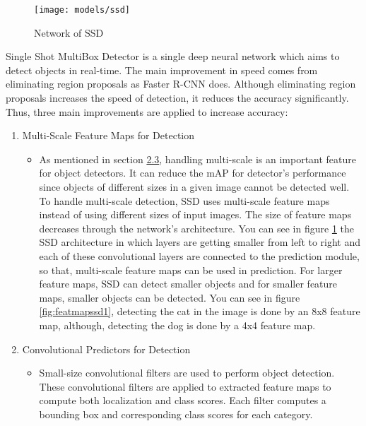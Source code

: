 \documentclass{article}
\begin{document}
\setlength{\parindent}{6ex}

\begin{figure}
    \centering
    \texttt{[image: models/ssd]}
    \caption{Network of SSD \cite{ssdcite}}
    \label{fig:ssd1}
\end{figure}

\indent

Single Shot MultiBox Detector \cite{ssdcite} is a single deep neural network which aims to detect 
objects in real-time. The main improvement in speed comes from eliminating region 
proposals as Faster R-CNN does. Although eliminating region proposals increases 
the speed of detection, it reduces the accuracy significantly. Thus, three main 
improvements are applied to increase accuracy:

\begin{enumerate}
    \item Multi-Scale Feature Maps for Detection
    \begin{itemize}
        \item As mentioned in section \hyperref[sec:multscale]{2.3}, handling multi-scale is an important feature 
for object detectors. It can reduce the mAP for detector's performance since objects 
of different sizes in a given image cannot be detected well. To handle multi-scale detection, 
SSD uses multi-scale feature maps instead of using different sizes of input images. 
The size of feature maps decreases through the network's architecture. You can see in figure 
\ref{fig:ssd1} the SSD architecture in which layers are getting smaller from left to right and 
each of these convolutional layers are connected to the prediction module, so that, multi-scale 
feature maps can be used in prediction. For larger feature maps, SSD can detect smaller objects 
and for smaller feature maps, smaller objects can be detected. You can see in figure 
\ref{fig:featmapssd1}, detecting the cat in the image is done by an 8x8 feature map, although, detecting 
the dog is done by a 4x4 feature map.
    \end{itemize}
    \item Convolutional Predictors for Detection
    \begin{itemize}
        \item Small-size convolutional filters are used to perform object detection. 
        These convolutional filters are applied to extracted feature maps to compute 
        both localization and class scores. Each filter computes a bounding box and 
        corresponding class scores for each category.

\end{itemize}
\end{enumerate}
\end{document}
